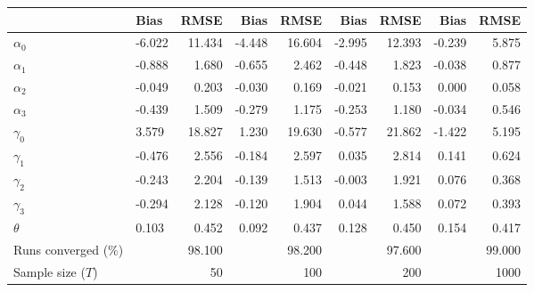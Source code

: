 
\begin{tabular}[t]{llrrrrrrr}
\toprule
  & Bias & RMSE & Bias & RMSE & Bias & RMSE & Bias & RMSE\\
\midrule
$\alpha_{0}$ & -6.022 & 11.434 & -4.448 & 16.604 & -2.995 & 12.393 & -0.239 & 5.875\\
$\alpha_{1}$ & -0.888 & 1.680 & -0.655 & 2.462 & -0.448 & 1.823 & -0.038 & 0.877\\
$\alpha_{2}$ & -0.049 & 0.203 & -0.030 & 0.169 & -0.021 & 0.153 & 0.000 & 0.058\\
$\alpha_{3}$ & -0.439 & 1.509 & -0.279 & 1.175 & -0.253 & 1.180 & -0.034 & 0.546\\
$\gamma_{0}$ & 3.579 & 18.827 & 1.230 & 19.630 & -0.577 & 21.862 & -1.422 & 5.195\\
$\gamma_{1}$ & -0.476 & 2.556 & -0.184 & 2.597 & 0.035 & 2.814 & 0.141 & 0.624\\
$\gamma_{2}$ & -0.243 & 2.204 & -0.139 & 1.513 & -0.003 & 1.921 & 0.076 & 0.368\\
$\gamma_{3}$ & -0.294 & 2.128 & -0.120 & 1.904 & 0.044 & 1.588 & 0.072 & 0.393\\
$\theta$ & 0.103 & 0.452 & 0.092 & 0.437 & 0.128 & 0.450 & 0.154 & 0.417\\
Runs converged (\%) &  & 98.100 &  & 98.200 &  & 97.600 &  & 99.000\\
Sample size ($T$) &  & 50 &  & 100 &  & 200 &  & 1000\\
\bottomrule
\end{tabular}
